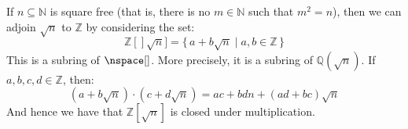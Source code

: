     \begin{example}
        If $n\subseteq\mathbb{N}$ is square free (that is, there is no
        $m\in\mathbb{N}$ such that $m^{2}=n$), then we can adjoin
        $\sqrt{n}$ to $\mathbb{Z}$ by considering the set:
        \begin{equation}
            \mathbb{Z}[]\sqrt{n}]=\{\,a+b\sqrt{n}\;|\;a,b\in\mathbb{Z}\,\}
        \end{equation}
        This is a subring of $\nspace[]$. More precisely, it is a subring of
        $\mathbb{Q}(\sqrt{n})$. If $a,b,c,d\in\mathbb{Z}$, then:
        \begin{equation}
            (a+b\sqrt{n})\cdot(c+d\sqrt{n})=ac+bdn+(ad+bc)\sqrt{n}
        \end{equation}
        And hence we have that $\mathbb{Z}[\sqrt{n}]$ is closed under
        multiplication.
    \end{example}
